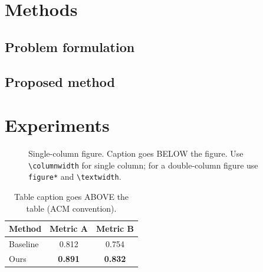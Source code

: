 \documentclass[sigconf,review]{acmart}
\begin{document}
\section{Methods}
\label{sec:methods}

\subsection{Problem formulation}

\subsection{Proposed method}

\section{Experiments}
\label{sec:experiments}

\begin{figure}[t]
\centering
\fbox{\rule{0pt}{3cm}\rule{\columnwidth}{0pt}}
\caption{Single-column figure. Caption goes BELOW the figure. Use
\texttt{\textbackslash columnwidth} for single column; for a double-column
figure use \texttt{figure*} and \texttt{\textbackslash textwidth}.}
\label{fig:result}
\end{figure}

\begin{table}[t]
\caption{Table caption goes ABOVE the table (ACM convention).}
\label{tab:results}
\centering
\begin{tabular}{lcc}
\toprule
Method   & Metric A       & Metric B       \\
\midrule
Baseline & 0.812          & 0.754          \\
Ours     & \textbf{0.891} & \textbf{0.832} \\
\bottomrule
\end{tabular}
\end{table}
\end{document}
